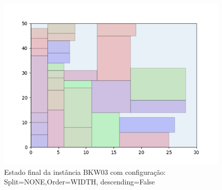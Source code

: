 \begin{figure}[H]
    \centering
    \caption[]{Estado final da instância BKW03 com configuração: Split=NONE,Order=WIDTH, descending=False}
    \label{fig:bkw03-none-width-false}
    \includegraphics[scale=0.5]{output/figures/bkw/bkw03/none/width/false/00}
\end{figure}